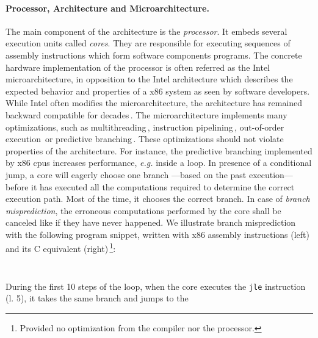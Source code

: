 \paragraph{Processor, Architecture and Microarchitecture.}
%
The main component of the architecture is the \emph{processor}.
%
It embeds several execution units called \emph{cores}.
%
They are responsible for executing sequences of assembly instructions which form
software components programs.
%
The concrete hardware implementation of the processor is often referred as the
Intel microarchitecture, in opposition to the Intel architecture which describes
the expected behavior and properties of a x86 system as seen by software
developers.
%
While Intel often modifies the microarchitecture, the architecture has remained
backward compatible for decades\,\cite{turley2014introx86}.
%
The microarchitecture implements many optimizations, such as
multithreading\,\cite{marr2002hypertheading}, instruction
pipelining\,\cite{fog2012microarchitecture}, out-of-order
execution\,\cite[Section 2]{fog2012microarchitecture} or predictive
branching\,\cite{milenkovic2002branchprediction}\cite[Section
3]{fog2012microarchitecture}.
%
These optimizations should not violate properties of the
architecture.
%
For instance, the predictive branching implemented by x86 \acp{cpu} increases
performance, \emph{e.g.} inside a loop.
%
In presence of a conditional jump, a core will eagerly choose one branch
---based on the past execution--- before it has executed all the computations
required to determine the correct execution path.
%
Most of the time, it chooses the correct branch.
%
In case of \emph{branch misprediction}, the erroneous computations performed by the core shall be canceled like if they have never happened.
%
We illustrate branch misprediction with the following program snippet, written with x86
assembly instructions (left) and its C equivalent (right)\,\footnote{Provided no
  optimization from the compiler nor the processor.}:
%
\begin{center}
  \begin{minipage}[t]{0.35\linewidth}
    \inputminted{asm}{Listings/predict.S}
  \end{minipage}
  \begin{minipage}[t]{0.35\linewidth}
    \inputminted{c}{Listings/predict.c}
  \end{minipage}
\end{center}
%
During the first 10 steps of the loop, when the core executes the
\texttt{jle} instruction (l. 5), it takes the same branch and jumps to the
